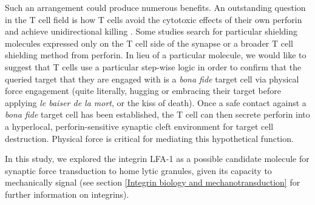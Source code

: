Such an arrangement could produce numerous benefits. An outstanding question in the T cell field is how T cells avoid the cytotoxic effects of their own perforin and achieve unidirectional killing \cite{Lopez2013}. Some studies search for particular shielding molecules expressed only on the T cell side of the synapse \cite{Balaji2002} or a broader T cell shielding method \cite{Rudd-schmidt} from perforin. In lieu of a particular molecule, we would like to suggest that T cells use a particular step-wise logic in order to confirm that the queried target that they are engaged with is a \textit{bona fide} target cell via physical force engagement (quite literally, hugging or embracing their target before applying \textit{le baiser de la mort}, or the kiss of death). Once a safe contact against a \textit{bona fide} target cell has been established, the T cell can then secrete perforin into a hyperlocal, perforin-sensitive synaptic cleft environment for target cell destruction. Physical force is critical for mediating this hypothetical function. 

In this study, we explored the integrin LFA-1 as a possible candidate molecule for synaptic force transduction to home lytic granules, given its capacity to mechanically signal (see section \ref{Integrin biology and mechanotransduction} for further information on integrins).

